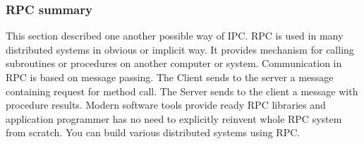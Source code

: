\subsubsection{RPC summary}
This section described one another possible way of \gls{IPC}. RPC is used in many
distributed systems in obvious or implicit way. It provides mechanism for calling 
subroutines or procedures on another computer or system. 
Communication in RPC is based on message passing.
The Client sends to the server a message containing request for method call.
The Server sends to the client a message with procedure results.
Modern software tools provide ready RPC libraries and application programmer has no need to explicitly reinvent whole RPC system from scratch.
You can build various distributed systems using RPC.
 


